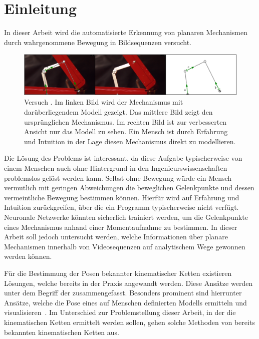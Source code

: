 %

\chapter{Einleitung}
\label{ch:einleitung}

In dieser Arbeit wird die automatisierte Erkennung von planaren Mechanismen durch wahrgenommene Bewegung in Bildsequenzen versucht.

\begin{figure}
\centering
    \includegraphics[width=\textwidth]{gfx/werkzeugkoffer_impl.png}
    \caption[Versuch ]{Versuch . Im linken Bild wird der Mechanismus mit darüberliegendem  Modell gezeigt. Das mittlere Bild zeigt den ursprünglichen Mechanismus. Im rechten Bild ist zur verbesserten Ansicht nur das  Modell zu sehen. Ein Mensch ist durch Erfahrung und Intuition in der Lage diesen Mechanismus direkt zu modellieren.}
    \label{fig:werkzeugkoffer_impl}
\end{figure}

Die Lösung des Problems ist interessant, da diese Aufgabe typischerweise von einem Menschen auch ohne Hintergrund in den Ingenieurswissenschaften problemslos gelöst werden kann.
Selbst ohne Bewegung würde ein Mensch vermutlich mit geringen Abweichungen die beweglichen Gelenkpunkte und dessen vermeintliche Bewegung bestimmen können.
Hierfür wird auf Erfahrung und Intuition zurückgreifen, über die ein Programm typischerweise nicht verfügt.
Neuronale Netzwerke könnten sicherlich trainiert werden, um die Gelenkpunkte eines Mechanismus anhand einer Momentaufnahme zu bestimmen.
In dieser Arbeit soll jedoch untersucht werden, welche Informationen über planare Mechanismen innerhalb von Videosequenzen auf analytischem Wege gewonnen werden können.

Für die Bestimmung der Posen bekannter kinematischer Ketten existieren Lösungen, welche bereits in der Praxis angewandt werden.
Diese Ansätze werden unter dem Begriff der  zusammengefasst.
Besonders prominent sind hierrunter Ansätze, welche die Pose eines auf Menschen definierten Modells ermitteln und visualisieren~\cite{Papandreou2018, Google2021, Google2021a}.
Im Unterschied zur Problemstellung dieser Arbeit, in der die kinematischen Ketten ermittelt werden sollen, gehen solche Methoden von bereits bekannten kinematischen Ketten aus.

